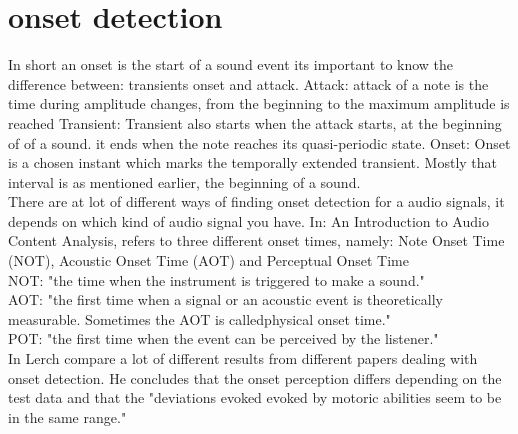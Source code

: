 \section{onset detection}
In short an onset is the start of a sound event \cite{ACA} 
its important to know the difference between: transients onset and attack. 
Attack: attack of a note is the time during amplitude changes, from the beginning to the maximum amplitude is reached \cite{ACA}
Transient: Transient also starts when the attack starts, at the beginning of of a sound. it ends when the note reaches its quasi-periodic state. \cite{ACA}
Onset: Onset is a chosen instant which marks the temporally extended transient. \cite{Bello2005} Mostly that interval is as mentioned earlier, the beginning of a sound. 
\\
There are at lot of different ways of  finding onset detection for a audio signals, it depends on which kind of audio signal you have.
In: An Introduction to Audio Content Analysis, \cite{ACA} refers to three different onset times, namely: Note Onset Time (NOT), Acoustic Onset Time (AOT) and Perceptual Onset Time 
\\
NOT: "the time when the instrument is triggered to make a sound." \cite{ACA}
\\
AOT: "the first time when a signal or an acoustic event is theoretically measurable. Sometimes the AOT is calledphysical onset time." \cite{ACA}
\\
POT: "the first time when the event can be perceived by the
listener." \cite{ACA}
\\
In \cite{ACA} Lerch compare a lot of different results from different papers dealing with onset detection. He concludes that the onset perception differs depending on the test data and that the "deviations evoked evoked by motoric abilities seem to be in the same range." \cite{ACA}
\\
